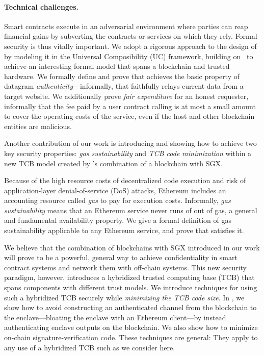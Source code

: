
\paragraph{Technical challenges.} Smart contracts execute in an adversarial environment where parties can reap financial gains by subverting the contracts or services on which they rely. Formal security is thus vitally important. We adopt a rigorous approach to the design of \tcs by modeling it in the Universal Composibility (UC) framework, building on~\cite{hawk,sgxsok} to achieve an interesting formal model that spans a blockchain and trusted hardware. We formally define and prove that \tc achieves the basic property of datagram {\em authenticity}---informally, that \tc faithfully relays current data from a target website. We additionally prove {\em fair expenditure} for an honest requester, informally that the fee paid by a user contract calling \tc is at most a small amount to cover the operating costs of the \tc service, even if the \tc host and other blockchain entities are malicious.

Another contribution of our work is introducing and showing how to achieve two key security properties: {\em gas sustainability} and {\em TCB code minimization} within a new TCB model created by \tc's combination of a blockchain with SGX. 

Because of the high resource costs of decentralized code execution and risk of application-layer denial-of-service (DoS) attacks, Ethereum includes an accounting resource called {\em gas} to pay for execution costs.  Informally, {\em gas sustainability} means that an Ethereum service never runs of out of gas, a general and fundamental availability property. We give a formal definition of gas sustainability applicable to any Ethereum service, and prove that \tc satisfies it.


We believe that the combination of blockchains with SGX introduced in our work will prove to be a powerful, general way to achieve confidentiality in smart contract systems and network them with off-chain systems. This new security paradigm, however, introduces a hybridized trusted computing base (TCB) that spans components with different trust models. We introduce techniques for using such a hybridized TCB securely while {\em minimizing the TCB code size}. In \tc, we show how to avoid constructing an authenticated channel from the blockchain to the enclave---bloating the enclave with an Ethereum client---by instead authenticating enclave outputs on the blockchain. We also show how to minimize on-chain signature-verification code. These techniques are general: They apply to any use of a hybridized TCB such as we consider here.

